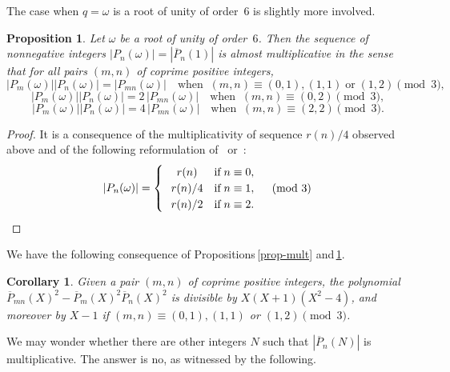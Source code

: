 \documentclass[11pt, a4paper]{amsart}
\newtheorem{prop}[theorem]{Proposition}
\newtheorem{coro}[theorem]{Corollary}
\theoremstyle{definition}
\newcommand\Pg{\overline{P}}
\numberwithin{equation}{section}
\begin{document}
The case when $q = \omega$ is a root of unity of order~$6$ is slightly more involved. 

\begin{prop}\label{prop-mult1}
Let $\omega$ be a root of unity of order~$6$. 
Then the sequence of nonnegative integers $|P_n(\omega)| =  |\Pg_n(1)|$ is almost multiplicative 
in the sense that for all pairs $(m,n)$ of coprime positive integers,
\begin{equation*}
|P_m(\omega)| |P_n(\omega)| = |P_{mn}(\omega)| \quad \text{when} \;\; (m,n) \equiv (0,1), (1,1)  \;  \text{or} \; (1,2) \pmod{3},
\end{equation*}
\begin{equation*}
|P_m(\omega)| |P_n(\omega)| = 2 \, |P_{mn}(\omega)| \quad \text{when} \;\; (m,n) \equiv (0,2)  \pmod{3},
\end{equation*}
\begin{equation*}
|P_m(\omega)| |P_n(\omega)| = 4 \, |P_{mn}(\omega)| \quad \text{when} \;\; (m,n) \equiv (2,2) \pmod{3}.
\end{equation*}
\end{prop}

\begin{proof}
It is a consequence of the multiplicativity of sequence $r(n)/4$ observed above and of the following reformulation
of~\cite[Th.\,1.1]{KR1} or~\cite[Th.\,1.6\,(d)]{KR3}:
\begin{equation*}
|P_n(\omega)| = 
\begin{cases}
\hskip 12pt  r(n)  & \text{if} \; n \equiv 0,  \\
\hskip 7pt   r(n)/4  & \text{if} \; n \equiv 1, \quad\pmod{3}\\
\hskip 7pt r(n)/2   & \text{if} \; n \equiv 2.
\end{cases}
\end{equation*}
\end{proof}

We have the following consequence of Propositions\,\ref{prop-mult} and\,\ref{prop-mult1}.

\begin{coro}
Given a pair $(m,n)$ of coprime positive integers,
the polynomial $\Pg_{mn}(X)^2 - \Pg_m(X)^2 \Pg_n(X)^2$ is divisible by $X(X+1)(X^2-4)$,
and moreover by $X-1$ if $(m,n) \equiv (0,1), (1,1)$ or $(1,2) \pmod{3}$.
\end{coro}

We may wonder whether there are other integers $N$ such that $|\Pg_n(N)|$ is multiplicative. 
The answer is no, as witnessed by the following.
\end{document}
